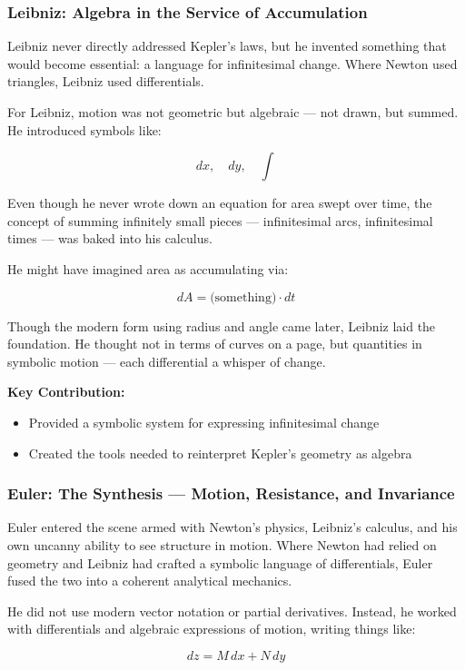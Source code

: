 \subsubsection{Leibniz: Algebra in the Service of Accumulation}

Leibniz never directly addressed Kepler’s laws, but he invented something that would become essential: a language for infinitesimal change. Where Newton used triangles, Leibniz used differentials.

For Leibniz, motion was not geometric but algebraic — not drawn, but summed. He introduced symbols like:

\[
dx, \quad dy, \quad \int
\]

Even though he never wrote down an equation for area swept over time, the concept of summing infinitely small pieces — infinitesimal arcs, infinitesimal times — was baked into his calculus.

He might have imagined area as accumulating via:

\[
dA = \text{(something)} \cdot dt
\]

Though the modern form using radius and angle came later, Leibniz laid the foundation. He thought not in terms of curves on a page, but quantities in symbolic motion — each differential a whisper of change.

\textbf{Key Contribution:}
\begin{itemize}
    \item Provided a symbolic system for expressing infinitesimal change
    \item Created the tools needed to reinterpret Kepler’s geometry as algebra
\end{itemize}

\subsubsection{Euler: The Synthesis — Motion, Resistance, and Invariance}

Euler entered the scene armed with Newton’s physics, Leibniz’s calculus, and his own uncanny ability to see structure in motion. Where Newton had relied on geometry and Leibniz had crafted a symbolic language of differentials, Euler fused the two into a coherent analytical mechanics.

He did not use modern vector notation or partial derivatives. Instead, he worked with differentials and algebraic expressions of motion, writing things like:

\[
dz = M\,dx + N\,dy
\]

